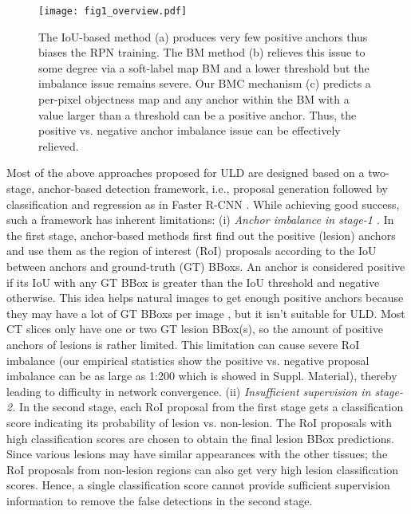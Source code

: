 \documentclass[runningheads]{llncs}
\newcommand{\ucite}[1]{\cite{#1}} 
\begin{document}
\begin{figure}[t]
\centering
\setlength{\abovecaptionskip}{0.cm}

\texttt{[image: fig1\_overview.pdf]}
\caption{The IoU-based method (a) produces very few positive anchors thus biases the RPN training. The BM method \cite{li2020bounding} (b) relieves this issue to some degree via a soft-label map BM and a lower threshold but the imbalance issue remains severe. Our BMC mechanism (c) predicts a per-pixel objectness map and any anchor within the BM with a value larger than a threshold can be a positive anchor. Thus, the positive vs. negative anchor imbalance issue can be effectively relieved.}
\label{fig:fig1_overview}
\end{figure}
Most of the above approaches proposed \ucite{tao2019improving,zhang2020Agg_Fas,tang2019uldor,yan20183DCE,li2019mvp,yan2019mulan,yang2020alignshift,zhang2020revisiting,yan2020learning} for ULD are designed based on a two-stage, anchor-based detection framework, i.e., proposal generation followed by classification and regression as in Faster R-CNN \cite{ren2015fasterrcnn}. While achieving good success, such a framework has inherent limitations: (i) \emph{Anchor imbalance in stage-1 \cite{oksuz2020imbalance}.}
In the first stage, anchor-based methods first find out the positive (lesion) anchors and use them as the region of interest (RoI) proposals according to the IoU between anchors and ground-truth (GT) BBoxs. An anchor is considered positive if its IoU with any GT BBox is greater than the IoU threshold and negative otherwise.  This idea helps natural images to get enough positive anchors because they may have a lot of GT BBoxs per image \cite{oksuz2020imbalance}, but it isn't suitable for ULD. Most CT slices only have one or two GT lesion BBox(s), so the amount of positive anchors of lesions is rather limited. This limitation can cause severe RoI imbalance (our empirical statistics show the positive vs. negative proposal imbalance can be as large as 1:200 which is showed in Suppl. Material), thereby leading to difficulty in network convergence.
(ii) \emph{Insufficient supervision in stage-2.} In the second stage, each RoI proposal from the first stage gets a classification score indicating its probability of lesion vs. non-lesion. The RoI proposals with high classification scores are chosen to obtain the final lesion BBox predictions. Since various lesions may have similar appearances with the other tissues; the  RoI proposals from non-lesion regions can also get very high lesion classification scores. Hence, a single classification score cannot provide sufficient supervision information to remove the false detections in the second stage. 
\end{document}
